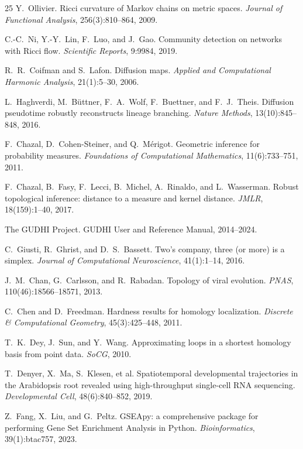 \documentclass[11pt]{article}
\begin{document}
\begin{thebibliography}{25}
Y.~Ollivier.
Ricci curvature of Markov chains on metric spaces.
\emph{Journal of Functional Analysis}, 256(3):810--864, 2009.

C.-C.~Ni, Y.-Y.~Lin, F.~Luo, and J.~Gao.
Community detection on networks with Ricci flow.
\emph{Scientific Reports}, 9:9984, 2019.

R.~R.~Coifman and S.~Lafon.
Diffusion maps.
\emph{Applied and Computational Harmonic Analysis}, 21(1):5--30, 2006.

L.~Haghverdi, M.~B\"uttner, F.~A.~Wolf, F.~Buettner, and F.~J.~Theis.
Diffusion pseudotime robustly reconstructs lineage branching.
\emph{Nature Methods}, 13(10):845--848, 2016.

F.~Chazal, D.~Cohen-Steiner, and Q.~M\'erigot.
Geometric inference for probability measures.
\emph{Foundations of Computational Mathematics}, 11(6):733--751, 2011.

F.~Chazal, B.~Fasy, F.~Lecci, B.~Michel, A.~Rinaldo, and L.~Wasserman.
Robust topological inference: distance to a measure and kernel distance.
\emph{JMLR}, 18(159):1--40, 2017.

The GUDHI Project.
GUDHI User and Reference Manual, 2014--2024.

C.~Giusti, R.~Ghrist, and D.~S.~Bassett.
Two's company, three (or more) is a simplex.
\emph{Journal of Computational Neuroscience}, 41(1):1--14, 2016.

J.~M.~Chan, G.~Carlsson, and R.~Rabadan.
Topology of viral evolution.
\emph{PNAS}, 110(46):18566--18571, 2013.

C.~Chen and D.~Freedman.
Hardness results for homology localization.
\emph{Discrete \& Computational Geometry}, 45(3):425--448, 2011.

T.~K.~Dey, J.~Sun, and Y.~Wang.
Approximating loops in a shortest homology basis from point data.
\emph{SoCG}, 2010.


T.~Denyer, X.~Ma, S.~Klesen, et al.
Spatiotemporal developmental trajectories in the Arabidopsis root revealed using high-throughput single-cell RNA sequencing.
\emph{Developmental Cell}, 48(6):840--852, 2019.

Z.~Fang, X.~Liu, and G.~Peltz.
GSEApy: a comprehensive package for performing Gene Set Enrichment Analysis in Python.
\emph{Bioinformatics}, 39(1):btac757, 2023.

\end{thebibliography}
\end{document}
